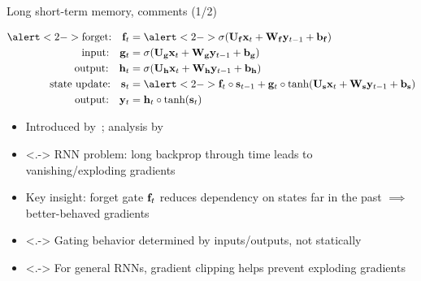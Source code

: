 \begin{frame}[t]{Long short-term memory, comments (1/2)}
    \begin{block}{}
        \vspace{-5mm}
        \begin{align*}
            \alert<2->{\text{forget:} \quad \f_t} &= \alert<2->{\sigma(\U_\f \x_t + \W_\f \y_{t-1} + \b_\f)} \\
            \text{input:} \quad \g_t &= \sigma(\U_\g \x_t + \W_\g \y_{t-1} + \b_\g) \\
            \text{output:} \quad \h_t &= \sigma(\U_\h \x_t + \W_\h \y_{t-1} + \b_\h) \\
            \text{state update:} \quad \s_t &= \alert<2->{\f_t} \circ \s_{t-1} + \g_t \circ \tanh(\U_\s \x_t + \W_\s \y_{t-1} + \b_\s) \\
            \text{output:} \quad \y_t &= \h_t \circ \tanh(\s_t)
        \end{align*}
    \end{block}

    \begin{itemize}
        \item<+-> Introduced by~\citet{HochreiterNC97}; analysis by \citet{GreffIEEENNLS17}
        \item<.-> RNN problem: long backprop through time leads to vanishing/exploding gradients
        \item<+-> Key insight: \alert{forget gate $\mathbf{f}_t$} reduces dependency on states far in the past $\implies$ better-behaved gradients
        \item<.-> Gating behavior determined by inputs/outputs, not statically
        \item<.-> For general RNNs, gradient clipping helps prevent exploding gradients \citep{MikolovPhD12,PascanuICML13}
    \end{itemize}
\end{frame}

